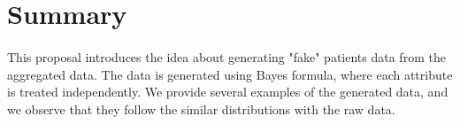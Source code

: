 \documentclass{article}
\begin{document}
\section{Summary}
\paragraph{}
This proposal introduces the idea about generating "fake" patients data from the aggregated data. The data is generated using Bayes formula, where each attribute is treated independently. We provide several examples of the generated data, and we observe that they follow the similar distributions with the raw data.
\end{document}
